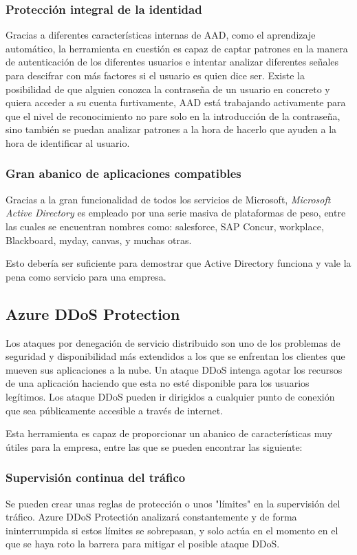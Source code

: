 \documentclass[english,runningheads,a4paper]{llncs}[2018/03/10]
\begin{document}
\subsubsection*{Protección integral de la identidad}
Gracias a diferentes características internas de AAD, como el aprendizaje
automático, la herramienta en cuestión es capaz de captar patrones en la manera
de autenticación de los diferentes usuarios e intentar analizar diferentes
señales para descifrar con más factores si el usuario es quien dice ser. Existe
la posibilidad de que alguien conozca la contraseña de un usuario en concreto y
quiera acceder a su cuenta furtivamente, AAD está trabajando activamente para
que el nivel de reconocimiento no pare solo en la introducción de la contraseña,
sino también se puedan analizar patrones a la hora de hacerlo que ayuden a la
hora de identificar al usuario.

\subsubsection*{Gran abanico de aplicaciones compatibles}
Gracias a la gran funcionalidad de todos los servicios de Microsoft,
\textit{Microsoft Active Directory} es empleado por una serie masiva de
plataformas de peso, entre las cuales se encuentran nombres como: salesforce,
SAP Concur, workplace, Blackboard, myday, canvas, y muchas otras. 

Esto debería ser suficiente para demostrar que Active Directory funciona y vale
la pena como servicio para una empresa. 

\subsection*{Azure DDoS Protection}
Los ataques por denegación de servicio distribuido son uno de los problemas de
seguridad y disponibilidad más extendidos a los que se enfrentan los clientes
que mueven sus aplicaciones a la nube. Un ataque DDoS intenga agotar los
recursos de una aplicación haciendo que esta no esté disponible para los
usuarios legítimos. Los ataque DDoS pueden ir dirigidos a cualquier punto de
conexión que sea públicamente accesible a través de internet.

Esta herramienta es capaz de proporcionar un abanico de características muy
útiles para la empresa, entre las que se pueden encontrar las siguiente:

\subsubsection*{Supervisión continua del tráfico}
Se pueden crear unas reglas de protección o unos "límites" en la supervisión del
tráfico. Azure DDoS Protectión analizará constantemente y de forma
ininterrumpida si estos límites se sobrepasan, y solo actúa en el momento en el
que se haya roto la barrera para mitigar el posible ataque DDoS.
    
\end{document}
